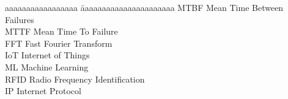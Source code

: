 
\newcommand{\abbrev}[2]{#1 \> #2\\ }
\begin{abbreviations}

\begin{tabbing}
  aaaaaaaaaaaaaaaaa \= aaaaaaaaaaaaaaaaaaaaaa\kill
  \abbrev{MTBF}{Mean Time Between Failures}
  \abbrev{MTTF}{Mean Time To Failure}
  \abbrev{FFT}{Fast Fourier Transform}
  \abbrev{IoT}{Internet of Things}
  \abbrev{ML}{Machine Learning}
  \abbrev{RFID}{Radio Frequency Identification}
  \abbrev{IP}{Internet Protocol}


\end{tabbing}
\end{abbreviations}